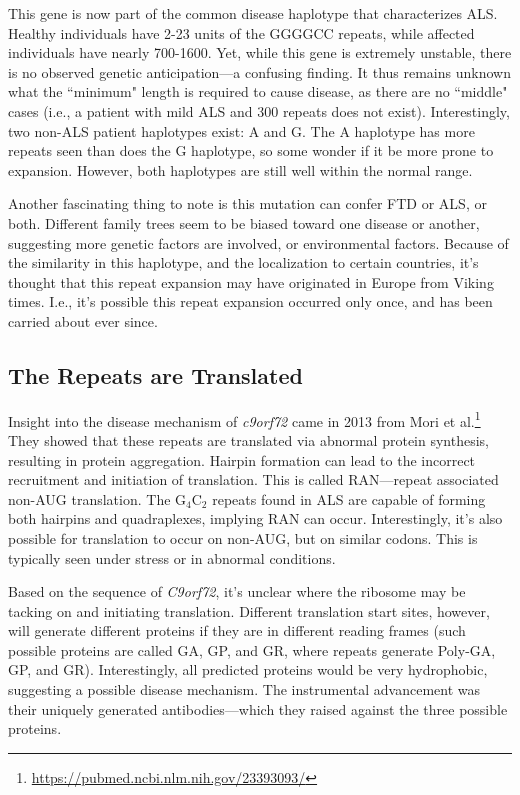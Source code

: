 This gene is now part of the common disease haplotype that characterizes ALS. Healthy individuals have 2-23 units of the GGGGCC repeats, while affected individuals have nearly 700-1600. Yet, while this gene is extremely unstable, there is no observed genetic anticipation---a confusing finding. It thus remains unknown what the ``minimum" length is required to cause disease, as there are no ``middle" cases (i.e., a patient with mild ALS and 300 repeats does not exist). Interestingly, two non-ALS patient haplotypes exist: A and G. The A haplotype has more repeats seen than does the G haplotype, so some wonder if it be more prone to expansion. However, both haplotypes are still well within the normal range.\newline

Another fascinating thing to note is this mutation can confer FTD or ALS, or both. Different family trees seem to be biased toward one disease or another, suggesting more genetic factors are involved, or environmental factors. Because of the similarity in this haplotype, and the localization to certain countries, it's thought that this repeat expansion may have originated in Europe from Viking times. I.e., it's possible this repeat expansion occurred only once, and has been carried about ever since.


\subsection*{The Repeats are Translated}

Insight into the disease mechanism of \textit{c9orf72} came in 2013 from Mori et al.\footnote{\url{https://pubmed.ncbi.nlm.nih.gov/23393093/}} They showed that these repeats are translated via abnormal protein synthesis, resulting in protein aggregation. Hairpin formation can lead to the incorrect recruitment and initiation of translation. This is called RAN---repeat associated non-AUG translation. The G$_4$C$_2$ repeats found in ALS are capable of forming both hairpins and quadraplexes, implying RAN can occur. Interestingly, it's also possible for translation to occur on non-AUG, but on similar codons. This is typically seen under stress or in abnormal conditions.\newline

Based on the sequence of \textit{C9orf72}, it's unclear where the ribosome may be tacking on and initiating translation. Different translation start sites, however, will generate different proteins if they are in different reading frames (such possible proteins are called GA, GP, and GR, where repeats generate Poly-GA, GP, and GR). Interestingly, all predicted proteins would be very hydrophobic, suggesting a possible disease mechanism. The instrumental advancement was their uniquely generated antibodies---which they raised against the three possible proteins.\newline

